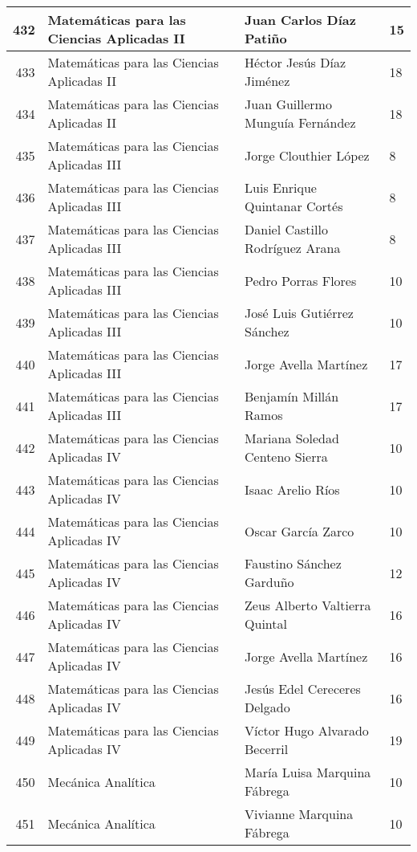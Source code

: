 \begin{table}[ht]
\begin{tabular}{rlll}
  432 & Matemáticas para las Ciencias Aplicadas II & Juan Carlos Díaz Patiño & 15 \\ \hline
  433 & Matemáticas para las Ciencias Aplicadas II & Héctor Jesús Díaz Jiménez & 18 \\ \hline
  434 & Matemáticas para las Ciencias Aplicadas II & Juan Guillermo Munguía Fernández & 18 \\ \hline
  435 & Matemáticas para las Ciencias Aplicadas III & Jorge Clouthier López & 8 \\ \hline
  436 & Matemáticas para las Ciencias Aplicadas III & Luis Enrique Quintanar Cortés & 8 \\ \hline
  437 & Matemáticas para las Ciencias Aplicadas III & Daniel Castillo Rodríguez Arana & 8 \\ \hline
  438 & Matemáticas para las Ciencias Aplicadas III & Pedro Porras Flores & 10 \\ \hline
  439 & Matemáticas para las Ciencias Aplicadas III & José Luis Gutiérrez Sánchez & 10 \\ \hline
  440 & Matemáticas para las Ciencias Aplicadas III & Jorge Avella Martínez & 17 \\ \hline
  441 & Matemáticas para las Ciencias Aplicadas III & Benjamín Millán Ramos & 17 \\ \hline
  442 & Matemáticas para las Ciencias Aplicadas IV & Mariana Soledad Centeno Sierra & 10 \\ \hline
  443 & Matemáticas para las Ciencias Aplicadas IV & Isaac Arelio Ríos & 10 \\ \hline
  444 & Matemáticas para las Ciencias Aplicadas IV & Oscar García Zarco & 10 \\ \hline
  445 & Matemáticas para las Ciencias Aplicadas IV & Faustino Sánchez Garduño & 12 \\ \hline
  446 & Matemáticas para las Ciencias Aplicadas IV & Zeus Alberto Valtierra Quintal & 16 \\ \hline
  447 & Matemáticas para las Ciencias Aplicadas IV & Jorge Avella Martínez & 16 \\ \hline
  448 & Matemáticas para las Ciencias Aplicadas IV & Jesús Edel Cereceres Delgado & 16 \\ \hline
  449 & Matemáticas para las Ciencias Aplicadas IV & Víctor Hugo Alvarado Becerril & 19 \\ \hline
  450 & Mecánica Analítica & María Luisa Marquina Fábrega & 10 \\ \hline
  451 & Mecánica Analítica & Vivianne Marquina Fábrega & 10 \\ \hline

\end{tabular}
\end{table}
